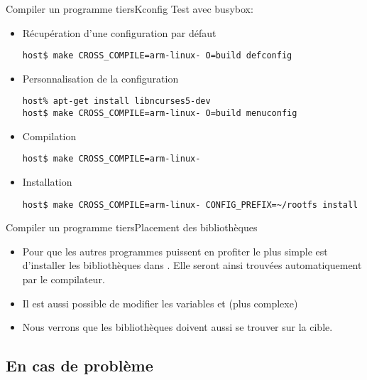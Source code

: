 \begin{frame}[fragile=singleslide]{Compiler un programme tiers}{Kconfig}
  Test avec busybox:
  \begin{itemize}
  \item Récupération d'une configuration par défaut
\begin{lstlisting}
host$ make CROSS_COMPILE=arm-linux- O=build defconfig
\end{lstlisting} %
  \item Personnalisation de la configuration
\begin{lstlisting}
host% apt-get install libncurses5-dev
host$ make CROSS_COMPILE=arm-linux- O=build menuconfig
\end{lstlisting} %
  \item Compilation
\begin{lstlisting}
host$ make CROSS_COMPILE=arm-linux-
\end{lstlisting} %
  \item Installation
\begin{lstlisting}
host$ make CROSS_COMPILE=arm-linux- CONFIG_PREFIX=~/rootfs install
\end{lstlisting} %
  \end{itemize}
\end{frame}

\begin{frame}{Compiler un programme tiers}{Placement des bibliothèques}
  \begin{itemize}
  \item Pour que les autres programmes puissent en profiter le plus simple est
    d'installer les bibliothèques dans . Elle
    seront ainsi trouvées automatiquement par le compilateur.
  \item Il est aussi possible de modifier les variables  et
     (plus complexe)
  \item Nous verrons que les bibliothèques doivent aussi se trouver sur la cible.
  \end{itemize}
\end{frame}

\subsection{En cas de problème}

